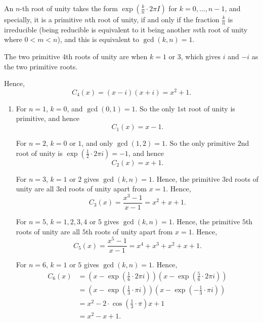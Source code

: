 \Question{\currfilebase}

An \(n\)-th root of unity takes the form \(\exp(\frac{k}{n} \cdot 2\pi I)\) for \(k = 0, \ldots, n - 1\), and specially, it is a primitive \(n\)th root of unity, if and only if the fraction \(\frac{k}{n}\) is irreducible (being reducible is equivalent to it being another \(m\)th root of unity where \(0 < m < n\)), and this is equivalent to \(\gcd(k, n) = 1\).

The two primitive \(4\)th roots of unity are when \(k = 1\) or \(3\), which gives \(i\) and \(-i\) as the two primitive roots.

Hence,
\[
    C_4(x) = (x - i)(x + i) = x^2 + 1.
\]

\begin{enumerate}
    \item For \(n = 1\), \(k = 0\), and \(\gcd(0, 1) = 1\). So the only \(1\)st root of unity is primitive, and hence
          \[
              C_1(x) = x - 1.
          \]

          For \(n = 2\), \(k = 0\) or \(1\), and only \(\gcd(1, 2) = 1\). So the only primitive \(2\)nd root of unity is \(\exp\left(\frac{1}{2} \cdot 2\pi i\right) = -1\), and hence
          \[
              C_2(x) = x + 1.
          \]

          For \(n = 3\), \(k = 1\) or \(2\) gives \(\gcd(k, n) = 1\). Hence, the primitive \(3\)rd roots of unity are all \(3\)rd roots of unity apart from \(x = 1\). Hence,
          \[
              C_3(x) = \frac{x^3 - 1}{x - 1} = x^2 + x + 1.
          \]

          For \(n = 5\), \(k = 1, 2, 3, 4\) or \(5\) gives \(\gcd(k, n) = 1\). Hence, the primitive \(5\)th roots of unity are all \(5\)th roots of unity apart from \(x = 1\). Hence,
          \[
              C_5(x) = \frac{x^5 - 1}{x - 1} = x^4 + x^3 + x^2 + x + 1.
          \]

          For \(n = 6\), \(k = 1\) or \(5\) gives \(\gcd(k, n) = 1\). Hence,
          \begin{align*}
              C_6 (x) & = \left(x - \exp\left(\frac{1}{6} \cdot 2\pi i\right)\right) \left(x - \exp\left(\frac{5}{6} \cdot 2\pi i\right)\right) \\
                      & = \left(x - \exp\left(\frac{1}{3} \cdot \pi i\right)\right) \left(x - \exp\left(- \frac{1}{3} \cdot \pi i\right)\right) \\
                      & = x^2 - 2 \cdot \cos \left(\frac{1}{3} \cdot \pi\right)x + 1                                                            \\
                      & = x^2 - x + 1.
          \end{align*}


\end{enumerate}
